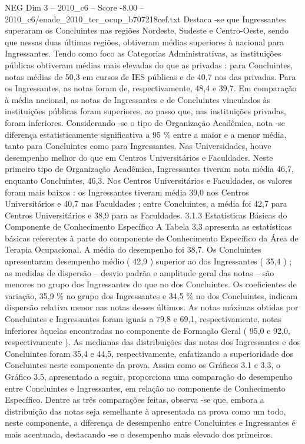 \begin{textsample}{NEG Dim 3 – 2010\_c6 – Score -8.00 – 2010\_c6/enade\_2010\_ter\_ocup\_b707218cef.txt}
Destaca -se que Ingressantes superaram os Concluintes nas regiões Nordeste, Sudeste e Centro-Oeste, sendo que nessas duas últimas regiões, obtiveram médias superiores à nacional para Ingressantes.
Tendo como foco as Categorias Administrativas, as instituições públicas obtiveram médias mais elevadas do que as privadas : para Concluintes, notas médias de 50,3 em cursos de IES públicas e de 40,7 nos das privadas.
Para os Ingressantes, as notas foram de, respectivamente, 48,4 e 39,7.
Em comparação à média nacional, as notas de Ingressantes e de Concluintes vinculados às instituições públicas foram superiores, ao passo que, nas instituições privadas, foram inferiores.
Considerando -se o tipo de Organização Acadêmica, nota -se diferença estatisticamente significativa a 95 \% entre a maior e a menor média, tanto para Concluintes como para Ingressantes.
Nas Universidades, houve desempenho melhor do que em Centros Universitários e Faculdades.
Neste primeiro tipo de Organização Acadêmica, Ingressantes tiveram nota média 46,7, enquanto Concluintes, 46,3.
Nos Centros Universitários e Faculdades, os valores foram mais baixos : os Ingressantes tiveram média 39,0 nos Centros Universitários e 40,7 nas Faculdades ; entre Concluintes, a média foi 42,7 para Centros Universitários e 38,9 para as Faculdades. 3.1.3 Estatísticas Básicas do Componente de Conhecimento Específico A Tabela 3.3 apresenta as estatísticas básicas referentes à parte do componente de Conhecimento Específico da Área de Terapia Ocupacional.
A média do desempenho foi 38,7.
Os Concluintes apresentaram desempenho médio ( 42,9 ) superior ao dos Ingressantes ( 35,4 ) ; as medidas de dispersão – desvio padrão e amplitude geral das notas – são menores no grupo dos Ingressantes do que no dos Concluintes.
Os coeficientes de variação, 35,9 \% no grupo dos Ingressantes e 34,5 \% no dos Concluintes, indicam dispersão relativa menor nas notas desses últimos.
As notas máximas obtidas por Concluintes e Ingressantes foram iguais a 79,8 e 69,1, respectivamente, notas inferiores àquelas encontradas no componente de Formação Geral ( 95,0 e 92,0, respectivamente ).
As medianas das distribuições das notas dos Ingressantes e dos Concluintes foram 35,4 e 44,5, respectivamente, enfatizando a superioridade dos Concluintes neste componente da prova.
Assim como os Gráficos 3.1 e 3.3, o Gráfico 3.5, apresentado a seguir, proporciona uma comparação do desempenho entre Concluintes e Ingressantes, em relação ao componente de Conhecimento Específico.
Dentre as três comparações feitas, observa -se que, embora a distribuição das notas seja semelhante à apresentada na prova como um todo, neste componente, a diferença de desempenho entre Concluintes e Ingressantes é mais acentuada, destacando -se o desempenho mais elevado dos primeiros.

\end{textsample}

